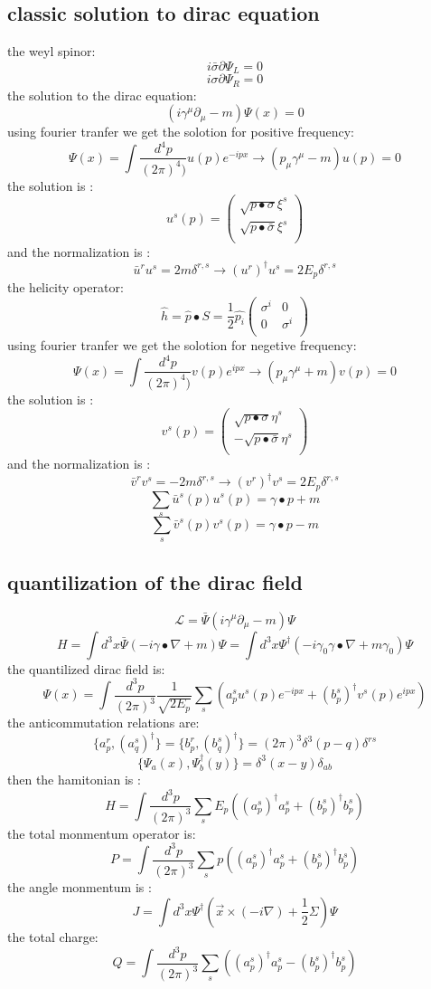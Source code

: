 \subsection{classic solution to dirac equation }
the weyl spinor:
\[i\bar{\sigma}\partial \Psi_L=0\]
\[i\sigma\partial\Psi_R=0\]
the solution to the dirac equation:
\[(i\gamma^{\mu}\partial_\mu-m)\Psi(x)=0\]
using fourier tranfer we get the solotion for positive frequency:
\[\Psi(x)=\int \frac{d^4p}{(2\pi)^4)}u(p)e^{-ipx}\rightarrow (p_\mu\gamma^\mu-m)u(p)=0\]
the solution is :
\begin{equation}
u^s(p)=\left(
\begin{array}{c}
\sqrt{p\bullet\sigma}\xi^s\\
\sqrt{p\bullet\bar{\sigma}}\xi^s\\
\end{array}
\right)
\end{equation}
and the normalization is :
\[\bar{u}^ru^s=2m\delta^{r,s}\rightarrow (u^r)^{\dagger}u^s=2E_p\delta^{r,s}\]
the helicity operator:
\[\hat{h}=\hat{p}\bullet S=\frac{1}{2}\hat{p_i}\left(
\begin{array}{cc}
\sigma^i&0\\
0&\sigma^i\\
\end{array}
\right)
\]
using fourier tranfer we get the solotion for negetive frequency:
\[\Psi(x)=\int \frac{d^4p}{(2\pi)^4)}v(p)e^{ipx}\rightarrow (p_\mu\gamma^\mu+m)v(p)=0\]
the solution is :
\begin{equation}
v^s(p)=\left(
\begin{array}{c}
\sqrt{p\bullet\sigma}\eta^s\\
-\sqrt{p\bullet\bar{\sigma}}\eta^s\\
\end{array}
\right)
\end{equation}
and the normalization is :
\[\bar{v}^rv^s=-2m\delta^{r,s}\rightarrow (v^r)^{\dagger}v^s=2E_p\delta^{r,s}\]
\[\sum_s \bar{u}^s(p)u^s(p)=\gamma\bullet p+m\]
\[\sum_s \bar{v}^s(p)v^s(p)=\gamma\bullet p-m\]

\subsection{quantilization of the dirac field}
\[\mathcal{L}=\bar{\Psi}(i\gamma^\mu\partial_\mu-m)\Psi\]
\[H=\int d^3x\bar{\Psi}(-i\gamma\bullet \nabla+m)\Psi=\int d^3x\Psi^\dagger(-i\gamma_0\gamma\bullet \nabla+m\gamma_0)\Psi\]
the quantilized dirac field is:
\[\Psi(x)=\int \frac{d^3p}{(2\pi)^3}\frac{1}{\sqrt{2E_p}}\sum_s(a_p^su^s(p)e^{-ipx}+(b_p^s)^\dagger v^s(p)e^{ipx})\]
the anticommutation relations are:
\[\{a_p^r,(a_q^s)^\dagger\}=\{b_p^r,(b_q^s)^\dagger\}=(2\pi)^3\delta^3(p-q)\delta^{rs}\]
\[\{\Psi_a(x),\Psi_b^\dagger(y)\}=\delta^3(x-y)\delta_{ab}\]
then the hamitonian is :
\[H=\int \frac{d^3p}{(2\pi)^3}\sum_sE_p((a_p^s)^\dagger a_p^s+(b_p^s)^\dagger b_p^s)\]
the total monmentum operator is:
\[P=\int \frac{d^3p}{(2\pi)^3}\sum_s p((a_p^s)^\dagger a_p^s+(b_p^s)^\dagger b_p^s)\]
the angle monmentum is :
\[J=\int d^3x\Psi^\dagger(\vec{x}\times(-i\nabla)+\frac{1}{2}\Sigma)\Psi\]
the total charge:
\[Q=\int \frac{d^3p}{(2\pi)^3}\sum_s ((a_p^s)^\dagger a_p^s-(b_p^s)^\dagger b_p^s)\]

